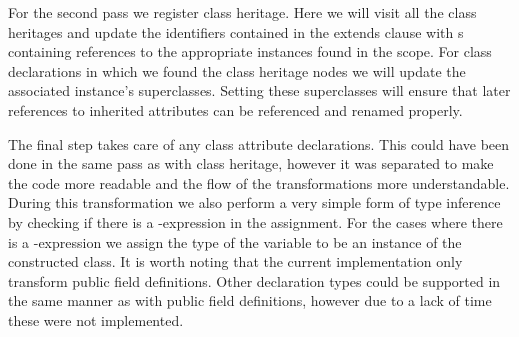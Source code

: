 For the second pass we register class heritage.
Here we will visit all the class heritages and update the identifiers contained in the extends clause with s containing references to the appropriate  instances found in the scope.
For class declarations in which we found the class heritage nodes we will update the associated  instance's superclasses.
Setting these superclasses will ensure that later references to inherited attributes can be referenced and renamed properly.

The final step takes care of any class attribute declarations.
This could have been done in the same pass as with class heritage, however it was separated to make the code more readable and the flow of the transformations more understandable.
During this transformation we also perform a very simple form of type inference by checking if there is a -expression in the assignment.
For the cases where there is a -expression we assign the type of the variable to be an instance of the constructed class.
It is worth noting that the current implementation only transform public field definitions.
Other declaration types could be supported in the same manner as with public field definitions, however due to a lack of time these were not implemented.

